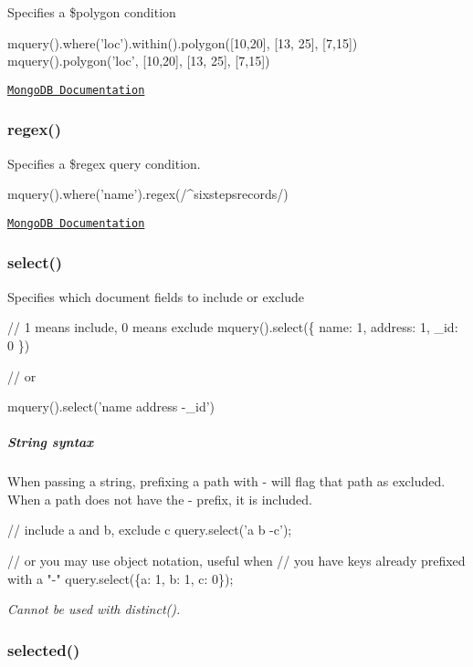 Specifies a {\ttfamily \$polygon} condition


\begin{DoxyCode}
mquery().where('loc').within().polygon([10,20], [13, 25], [7,15])
mquery().polygon('loc', [10,20], [13, 25], [7,15])
\end{DoxyCode}


\href{http://docs.mongodb.org/manual/reference/operator/polygon/}{\tt Mongo\+DB Documentation}

\subsubsection*{regex()}

Specifies a {\ttfamily \$regex} query condition.


\begin{DoxyCode}
mquery().where('name').regex(/^sixstepsrecords/)
\end{DoxyCode}


\href{http://docs.mongodb.org/manual/reference/operator/regex/}{\tt Mongo\+DB Documentation}

\subsubsection*{select()}

Specifies which document fields to include or exclude


\begin{DoxyCode}
// 1 means include, 0 means exclude
mquery().select(\{ name: 1, address: 1, \_id: 0 \})

// or

mquery().select('name address -\_id')
\end{DoxyCode}


\subparagraph*{String syntax}

When passing a string, prefixing a path with {\ttfamily -\/} will flag that path as excluded. When a path does not have the {\ttfamily -\/} prefix, it is included.


\begin{DoxyCode}
// include a and b, exclude c
query.select('a b -c');

// or you may use object notation, useful when
// you have keys already prefixed with a "-"
query.select(\{a: 1, b: 1, c: 0\});
\end{DoxyCode}


{\itshape Cannot be used with {\ttfamily distinct()}.}

\subsubsection*{selected()}

